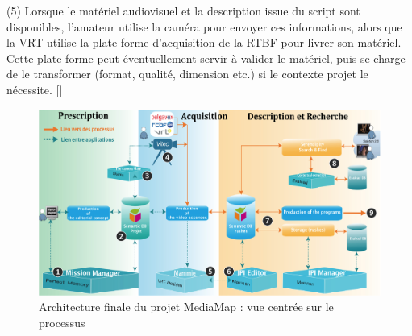 \begin{listenum}
	\item[(5)] Lorsque le matériel audiovisuel et la description issue du script sont disponibles, l'amateur utilise la caméra pour envoyer ces informations, alors que la VRT utilise la plate-forme d'acquisition de la RTBF pour livrer son matériel. 
	Cette plate-forme peut éventuellement servir à valider le matériel, puis se charge de le transformer (format, qualité, dimension etc.) si le contexte projet le nécessite. []
\end{listenum}


\begin{figure}[ht!]
\centering
\includegraphics[width=1\textwidth]{./images/Architecture-process-v1.png}
\caption{Architecture finale du projet MediaMap : vue centrée sur le processus}
\label{img:arch-process}
\end{figure}

